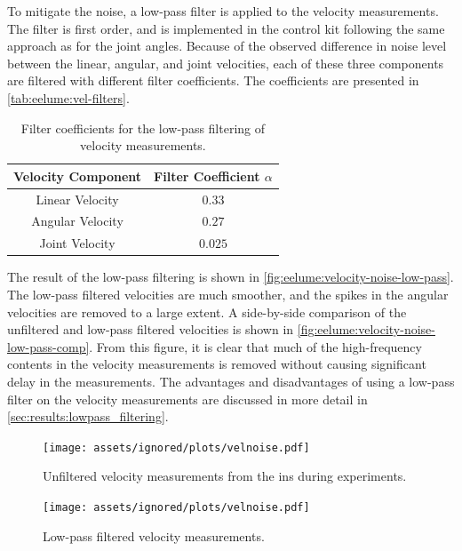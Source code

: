 To mitigate the noise, a low-pass filter is applied to the velocity measurements.
The filter is first order, and is implemented in the control kit following the
same approach as for the joint angles. Because of the observed difference in
noise level between the linear, angular, and joint velocities, each of these
three components are filtered with different filter coefficients. The coefficients
are presented in \autoref{tab:eelume:vel-filters}.

\begin{table}[h]
    \centering
    \begin{tabular}{|c|c|}
        \hline
        Velocity Component & Filter Coefficient \(\alpha\) \\ \hline \hline
        Linear Velocity & \(0.33\) \\ \hline
        Angular Velocity & \(0.27\) \\ \hline
        Joint Velocity & \(0.025\) \\ \hline
        \hline
    \end{tabular}
    \caption{Filter coefficients for the low-pass filtering of velocity measurements.}
    \label{tab:eelume:vel-filters}
\end{table}

The result of the low-pass filtering is shown in \autoref{fig:eelume:velocity-noise-low-pass}.
The low-pass filtered velocities are much smoother, and the spikes in the angular
velocities are removed to a large extent. A side-by-side comparison of the unfiltered
and low-pass filtered velocities is shown in \autoref{fig:eelume:velocity-noise-low-pass-comp}.
From this figure, it is clear that much of the high-frequency contents in the velocity measurements
is removed without causing significant delay in the measurements. The advantages and disadvantages
of using a low-pass filter on the velocity measurements are discussed in more detail in \autoref{sec:results:lowpass_filtering}.

\begin{figure}[h!]
    \centering
    \texttt{[image: assets/ignored/plots/velnoise.pdf]}
    \caption{Unfiltered velocity measurements from the \gls{ins} during experiments.}
    \label{fig:eelume:velocity-noise}
\end{figure}

\begin{figure}[h!]
    \centering
    \texttt{[image: assets/ignored/plots/velnoise.pdf]}
    \caption{Low-pass filtered velocity measurements.}
    \label{fig:eelume:velocity-noise-low-pass}
\end{figure}

